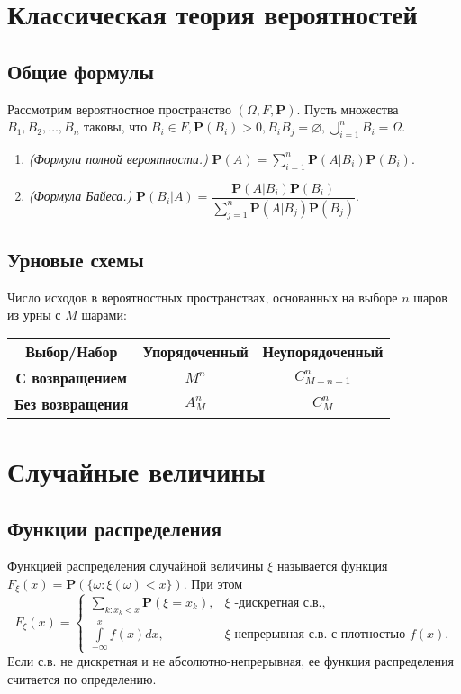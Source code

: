 \documentclass[a4paper,12pt]{scrartcl}
\newcommand{\Prb}{\mathbf{P}}
\begin{document}
\section{Классическая теория вероятностей}
\subsection{Общие формулы}
Рассмотрим вероятностное пространство $(\Omega,F,\Prb)$. Пусть множества $B_1,B_2,\ldots,B_n$ таковы, что $B_i \in F,\Prb (B_i) >0,B_iB_j = \varnothing, \bigcup\limits_{i=1}^{n} B_i = \Omega.$
\begin{enumerate}
\item \emph{(Формула полной вероятности.)} $\Prb(A) = \sum\limits_{i=1}^{n}\Prb(A|B_i)\Prb(B_i)$.
\item \emph{(Формула Байеса.)} $\Prb(B_i|A) = \dfrac{\Prb(A|B_i)\Prb(B_i)}{\sum\limits_{j=1}^{n}\Prb(A|B_j)\Prb(B_j)}$.
\end{enumerate}
\subsection{Урновые схемы}
Число исходов в вероятностных пространствах, основанных на выборе $n$ шаров из урны с $M$ шарами:

\begin{tabular}{|c|c|c|}
{\bfseries Выбор/Набор} & \bfseries{Упорядоченный} &{\bfseries Неупорядоченный}\\
\hfill
{\bfseries С возвращением} & {$M^n$} &{$C^n_{M+n-1}$}\\
\hfill
{\bfseries Без возвращения} & {$A_M^n$} &{$C_M^n$}\\
\end{tabular}
\section{Случайные величины}
\subsection{Функции распределения}
Функцией распределения случайной величины $\xi$ называется функция $F_\xi(x) = \Prb(\{\omega: \xi(\omega) < x\})$. При этом $$ F_\xi(x)= \begin{cases} \sum\limits_{k: x_k < x}\Prb(\xi = x_k),& \xi\text{ -дискретная с.в., } \\ \int\limits_{-\infty}^{x}f(x)dx,& \xi \text{-непрерывная с.в. с плотностью } f(x).\end{cases} $$ Если с.в. не дискретная и не абсолютно-непрерывная, ее функция распределения считается по определению.
\end{document}
